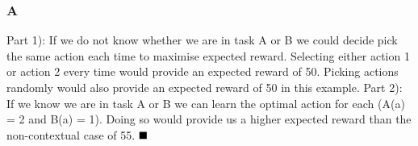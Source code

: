 \subsubsection*{A}
Part 1): If we do not know whether we are in task A or B we could decide pick the same action each time to maximise expected reward. Selecting either action 1 or action 2 every time would provide an expected reward of 50. Picking actions randomly would also provide an expected reward of 50 in this example.
Part 2): If we know we are in task A or B we can learn the optimal action for each (A(a) = 2 and B(a) = 1). Doing so would provide us a higher expected reward than the non-contextual case of 55.
$
\hfill \blacksquare
$